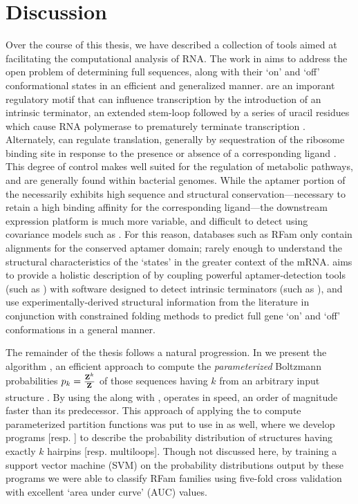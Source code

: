 
\chapter{Discussion}
\label{ch:disc}


Over the course of this thesis, we have described a collection of tools aimed
at facilitating the computational analysis of RNA. The work in 
aims to address the open problem of determining full \rb sequences, along
with their `on' and `off' conformational states in an efficient and generalized
manner. \Rbs are an imporant regulatory motif that can influence
transcription by the introduction of an intrinsic terminator, an extended stem-loop
followed by a series of uracil residues which cause RNA polymerase to prematurely
terminate transcription \citep{gusarov:1999uu,yarnell:1999wt}. Alternately,
\rbs can regulate translation, generally by sequestration of the ribosome
binding site in response to the presence or absence of a corresponding ligand
\citep{barrick:2007gw}. This degree of control makes \rbs well suited for
the regulation of metabolic pathways, and are generally found within bacterial
genomes. While the aptamer portion of the \rb necessarily exhibits high
sequence and structural conservation---necessary to retain a high binding affinity
for the corresponding ligand---the downstream expression platform is much more
variable, and difficult to detect using covariance models such as \infernal
\citep{infernal}. For this reason, databases such as RFam \citep{nawrocki:2014uy}
only contain alignments for the conserved aptamer domain; rarely enough to
understand the structural characteristics of the \rb `states' in the greater
context of the mRNA. \rfinder aims to provide a holistic description of
\rbs by coupling powerful aptamer-detection tools (such as \infernal) with software
designed to detect intrinsic terminators (such as \tthp), and use
experimentally-derived structural information from the literature in conjunction
with constrained folding methods to predict full gene `on' and `off' conformations
in a general manner.

The remainder of the thesis follows a natural progression. In  we
present the algorithm \fftbor, an efficient approach to compute the
{\em parameterized} Boltzmann probabilities $p_k = \frac{{\bf Z}^{k}_{}}{{\bf Z}^{}_{}}$ of
those sequences having \bpd $k$ from an arbitrary input structure
\strSt. By using the \fft along with \nRoUs, \fftbor operates in  speed,
an order of magnitude faster than its predecessor. This approach of applying the
\fft to compute parameterized partition functions was put to use in
\citep{ding:2014ex} as well, where we develop programs 
[resp. ] to describe the probability distribution of structures
having exactly $k$ hairpins [resp. multiloops]. Though not discussed here, by
training a support vector machine (SVM) on the probability distributions output
by these
programs we were able to classify RFam families using five-fold cross validation
with excellent `area under curve' (AUC) values.

